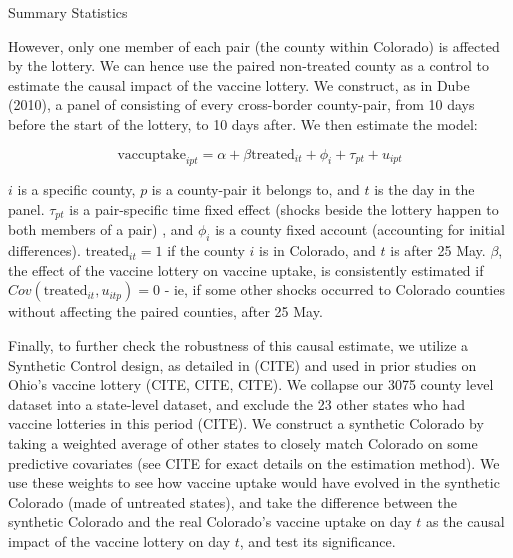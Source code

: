\documentclass[12pt]{article}
\begin{document}
\begin{spacing}{1.5}
		\begin{table}
			\centering
			\caption{Summary Statistics}
			\centerline{}
			\label{table:didsummary}
		\end{table}
		
		However, only one member of each pair (the county within Colorado) is affected by the lottery. We can hence use the paired non-treated county as a control to estimate the causal impact of the vaccine lottery. We construct, as in Dube (2010), a panel of consisting of every cross-border county-pair, from 10 days before the start of the lottery, to 10 days after. We then estimate the model:
		
		\begin{equation} \label{eq:pairdesign}
			\textrm{vaccuptake}_{ipt} = \alpha + \beta \textrm{treated}_{it} + \phi_i + \tau_{pt} + u_{ipt}
		\end{equation}
		
		$i$ is a specific county, $p$ is a county-pair it belongs to, and $t$ is the day in the panel. $\tau_{pt}$ is a pair-specific time fixed effect (shocks beside the lottery happen to both members of a pair) , and $\phi_i$ is a county fixed account (accounting for initial differences). $\textrm{treated}_{it}=1$ if the county $i$ is in Colorado, and $t$ is after 25 May. $\beta$, the effect of the vaccine lottery on vaccine uptake, is consistently estimated if $Cov(\textrm{treated}_{it}, u_{itp})=0$ - ie, if some other shocks occurred to Colorado counties without affecting the paired counties, after 25 May.
		
		Finally, to further check the robustness of this causal estimate, we utilize a Synthetic Control design, as detailed in (CITE) and used in prior studies on Ohio's vaccine lottery (CITE, CITE, CITE). We collapse our 3075 county level dataset into a state-level dataset, and exclude the 23 other states who had vaccine lotteries in this period (CITE). We construct a synthetic Colorado by taking a weighted average of other states to closely match Colorado on some predictive covariates (see CITE for exact details on the estimation method). We use these weights to see how vaccine uptake would have evolved in the synthetic Colorado (made of untreated states), and take the difference between the synthetic Colorado and the real Colorado's vaccine uptake on day $t$ as the causal impact of the vaccine lottery on day $t$, and test its significance.
		
		

\end{spacing}
\end{document}
